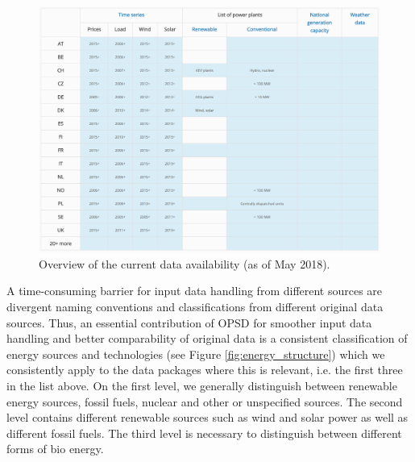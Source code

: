 \documentclass[article,sort&compress]{elsarticle}
\begin{document}
\begin{figure}[!h]
    \centering
    \includegraphics[width=1\textwidth]{figures/data_availability_overview.PNG}
    \caption{Overview of the current data availability (as of May 2018).}
    \label{fig:overview}
\end{figure}

A time-consuming barrier for input data handling from different sources are divergent naming conventions and classifications from different original data sources. Thus, an essential contribution of OPSD for smoother input data handling and better comparability of original data is a consistent classification of energy sources and technologies (see Figure \ref{fig:energy_structure}) which we consistently apply to the data packages where this is relevant, i.e. the first three in the list above. On the first level, we generally distinguish between renewable energy sources, fossil fuels, nuclear and other or unspecified sources. The second level contains different renewable sources such as wind and solar power as well as different fossil fuels. The third level is necessary to distinguish between different forms of bio energy.  
\end{document}
